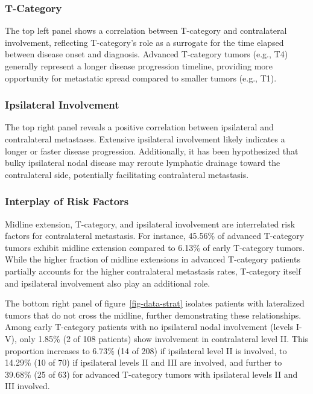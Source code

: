 \documentclass[
  sn-mathphys-num,
]{sn-jnl}
\begin{document}
\subsubsection{T-Category}\label{t-category}

The top left panel shows a correlation between T-category and
contralateral involvement, reflecting T-category's role as a surrogate
for the time elapsed between disease onset and diagnosis. Advanced
T-category tumors (e.g., T4) generally represent a longer disease
progression timeline, providing more opportunity for metastatic spread
compared to smaller tumors (e.g., T1).

\subsubsection{Ipsilateral Involvement}\label{ipsilateral-involvement}

The top right panel reveals a positive correlation between ipsilateral
and contralateral metastases. Extensive ipsilateral involvement likely
indicates a longer or faster disease progression. Additionally, it has
been hypothesized that bulky ipsilateral nodal disease may reroute
lymphatic drainage toward the contralateral side, potentially
facilitating contralateral metastasis.

\subsubsection{Interplay of Risk
Factors}\label{interplay-of-risk-factors}

Midline extension, T-category, and ipsilateral involvement are
interrelated risk factors for contralateral metastasis. For instance,
45.56\% of advanced T-category tumors exhibit midline extension compared
to 6.13\% of early T-category tumors. While the higher fraction of
midline extensions in advanced T-category patients partially accounts
for the higher contralateral metastasis rates, T-category itself and
ipsilateral involvement also play an additional role.

The bottom right panel of figure~\ref{fig-data-strat} isolates patients
with lateralized tumors that do not cross the midline, further
demonstrating these relationships. Among early T-category patients with
no ipsilateral nodal involvement (levels I-V), only 1.85\% (2 of 108
patients) show involvement in contralateral level II. This proportion
increases to 6.73\% (14 of 208) if ipsilateral level II is involved, to
14.29\% (10 of 70) if ipsilateral levels II and III are involved, and
further to 39.68\% (25 of 63) for advanced T-category tumors with
ipsilateral levels II and III involved.
\end{document}
